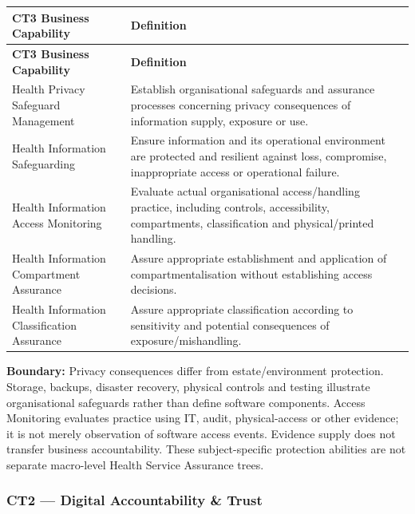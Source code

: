 \label{rad:business:795}
\begingroup\small\setlength{\TableWidth}{\dimexpr\linewidth-4\tabcolsep-3\arrayrulewidth\relax}
\begin{longtable}{|>{\raggedright\arraybackslash}p{0.35\TableWidth}|>{\raggedright\arraybackslash}p{0.65\TableWidth}|}
\hline\rowcolor{TableHead}\textbf{CT3 Business Capability} & \textbf{Definition}\\\hline\endfirsthead
\hline\rowcolor{TableHead}\textbf{CT3 Business Capability} & \textbf{Definition}\\\hline\endhead
\hline\endfoot
Health Privacy Safeguard Management & Establish organisational safeguards and assurance processes concerning privacy consequences of information supply, exposure or use.\\\hline
Health Information Safeguarding & Ensure information and its operational environment are protected and resilient against loss, compromise, inappropriate access or operational failure.\\\hline
Health Information Access Monitoring & Evaluate actual organisational access/\allowbreak{}handling practice, including controls, accessibility, compartments, classification and physical/\allowbreak{}printed handling.\\\hline
Health Information Compartment Assurance & Assure appropriate establishment and application of compartmentalisation without establishing access decisions.\\\hline
Health Information Classification Assurance & Assure appropriate classification according to sensitivity and potential consequences of exposure/\allowbreak{}mishandling.\\\hline
\end{longtable}\endgroup
{}\label{rad:business:803}

\textbf{Boundary:} Privacy consequences differ from estate/\allowbreak{}environment protection. Storage, backups, disaster recovery, physical controls and testing illustrate organisational safeguards rather than define software components. Access Monitoring evaluates practice using IT, audit, physical-access or other evidence; it is not merely observation of software access events. Evidence supply does not transfer business accountability. These subject-specific protection abilities are not separate macro-level Health Service Assurance trees.

\label{rad:business:805}
\subsubsection*{CT2 — Digital Accountability \& Trust}
\label{rad:business:807}

